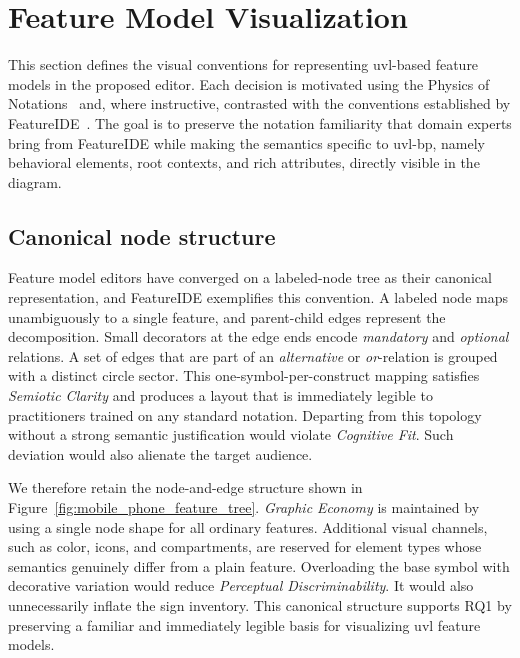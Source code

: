 \section{Feature Model Visualization}
\label{sec:concept_visualization}
 
This section defines the visual conventions for representing \gls{uvl}-based feature models in the proposed editor.
Each decision is motivated using the Physics of Notations~\cite{moody_physics_2009} and, where instructive, contrasted with the conventions established by FeatureIDE~\cite{kastner_featureide_2009}.
The goal is to preserve the notation familiarity that domain experts bring from FeatureIDE while making the semantics specific to \gls{uvl}-\gls{bp}, namely behavioral elements, root contexts, and rich attributes, directly visible in the diagram.

\subsection{Canonical node structure}
\label{subsec:vis_nodes}
 
Feature model editors have converged on a labeled-node tree as their canonical representation, and FeatureIDE exemplifies this convention.
A labeled node maps unambiguously to a single feature, and parent-child edges represent the decomposition.
Small decorators at the edge ends encode \textit{mandatory} and \textit{optional} relations.
A set of edges that are part of an \textit{alternative} or \textit{or}-relation is grouped with a distinct circle sector.
This one-symbol-per-construct mapping satisfies \textit{Semiotic Clarity} and produces a layout that is immediately legible to practitioners trained on any standard notation.
Departing from this topology without a strong semantic justification would violate \textit{Cognitive Fit}.
Such deviation would also alienate the target audience.

We therefore retain the node-and-edge structure shown in Figure~\ref{fig:mobile_phone_feature_tree}.
\textit{Graphic Economy} is maintained by using a single node shape for all ordinary features.
Additional visual channels, such as color, icons, and compartments, are reserved for element types whose semantics genuinely differ from a plain feature.
Overloading the base symbol with decorative variation would reduce \textit{Perceptual Discriminability}.
It would also unnecessarily inflate the sign inventory.
This canonical structure supports RQ1 by preserving a familiar and immediately legible basis for visualizing \gls{uvl} feature models.

